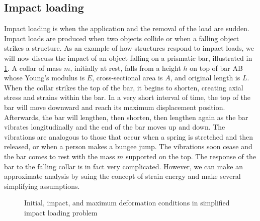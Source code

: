 \documentclass[
10pt,
a4paper,
openany,
svgnames,
]{book} %
\begin{document}
\subsection{Impact loading}

Impact loading is when the application and the removal of the load are sudden. Impact loads are produced when two objects collide or when a falling object strikes a structure. As an example of how structures respond to impact loads, we will now discuss the impact of an object falling on a prismatic bar, illustrated in \cref{fig: impact loading}. A collar of mass $m$, initially at rest, falls from a height $h$ on top of bar AB whose Young's modulus is $E$, cross-sectional area is $A$, and original length is $L$. When the collar strikes the top of the bar, it begins to shorten, creating axial stress and strains within the bar. In a very short interval of time, the top of the bar will move downward and reach its maximum displacement position. Afterwards, the bar will lengthen, then shorten, then lengthen again as the bar vibrates longitudinally and the end of the bar moves up and down. The vibrations are analogous to those that occur when a spring is stretched and then released, or when a person makes a bungee jump. The vibrations soon cease and the bar comes to rest with the mass $m$ supported on the top. The response of the bar to the falling collar is in fact very complicated. However, we can make an approximate analysis by suing the concept of strain energy and make several simplifying assumptions.

\begin{figure}[h]
  \centering
  \caption{Initial, impact, and maximum deformation conditions in simplified impact loading problem}
  \label{fig: impact loading}
  \end{figure}
\end{document}
